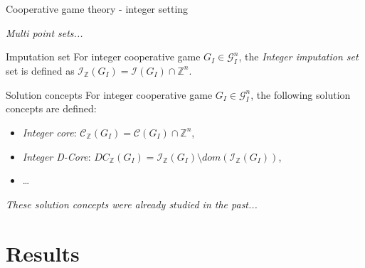 \documentclass{beamer}
\newcommand{\Z}{\mathbb{Z}}
\begin{document}


\begin{frame}{Cooperative game theory - integer setting}

    \textit{Multi point sets...}


    \begin{block}{Imputation set}
        For integer cooperative game $G_I \in \mathcal{G}_I^n$, the \emph{Integer imputation set} set is defined as $\mathcal{I}_{\Z}(G_I) = \mathcal{I}(G_I) \cap \Z^{n}$.
    \end{block}


    \begin{block}{Solution concepts}
        For integer cooperative game $G_I \in \mathcal{G}_I^n$, the following solution concepts are defined:
        \begin{itemize}
            \item \emph{Integer core}: $\mathcal{C}_{\Z}(G_I) = \mathcal{C}(G_I) \cap \Z^{n}$,
            \item \emph{Integer D-Core}: $DC_{\Z}(G_I) = \mathcal{I}_{\Z}(G_I) \setminus dom(\mathcal{I}_{\Z}(G_I))$,
            \item \dots
        \end{itemize}
    \end{block}


    \textit{These solution concepts were already studied in the past...}
\end{frame}




\section{Results}

\end{document}
